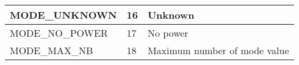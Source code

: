 \documentclass{template/openetcs_article}
\begin{document}
\begin{longtable}{|l|l|l|}
	\hline
		\begin{minipage}[t]{0.45\linewidth} MODE\_UNKNOWN	\end{minipage}
	&	\begin{minipage}[t]{0.15\linewidth} 16	\end{minipage} 
	&	\begin{minipage}[t]{0.45\linewidth} Unknown	\end{minipage} \\
	\hline
		\begin{minipage}[t]{0.45\linewidth} MODE\_NO\_POWER	\end{minipage}
	&	\begin{minipage}[t]{0.15\linewidth} 17	\end{minipage} 
	&	\begin{minipage}[t]{0.45\linewidth} No power	\end{minipage} \\
	\hline
		\begin{minipage}[t]{0.45\linewidth} MODE\_MAX\_NB	\end{minipage}
	&	\begin{minipage}[t]{0.15\linewidth} 18	\end{minipage} 
	&	\begin{minipage}[t]{0.45\linewidth} Maximum number of mode value	\end{minipage} \\
	\hline
\end{longtable}
\end{document}
